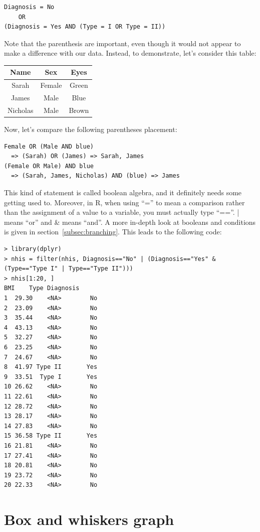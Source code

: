 \documentclass{report}
\newcommand{\code}[1]{\textsf{\ttfamily #1}}
\begin{document}
	\begin{verbatim}
Diagnosis = No 
	OR 
(Diagnosis = Yes AND (Type = I OR Type = II))	
	\end{verbatim}
	Note that the parenthesis are important, even though it would not appear to make a difference with our data. Instead, to demonstrate, let's consider this table:
	
\begin{tabular}{|c|c|c|}
	\hline
	Name & Sex & Eyes \\
	\hline
	Sarah & Female & Green \\
	James & Male & Blue \\
	Nicholas & Male & Brown \\
	\hline
\end{tabular}

Now, let's compare the following parentheses placement:
\begin{verbatim}
Female OR (Male AND blue)
  => (Sarah) OR (James) => Sarah, James
(Female OR Male) AND blue
  => (Sarah, James, Nicholas) AND (blue) => James
\end{verbatim}
	
	This kind of statement is called boolean algebra, and it definitely needs some getting used to. Moreover, in R, when using ``='' to mean a comparison rather than the assignment of a value to a variable, you must actually type ``==''. \code{|} means ``or'' and \code{\&} means ``and''. A more in-depth look at booleans and conditions is given in section~\ref{subsec:branching}. This leads to the following code:
	
	\begin{verbatim}
> library(dplyr)
> nhis = filter(nhis, Diagnosis=="No" | (Diagnosis=="Yes" & (Type=="Type I" | Type=="Type II")))
> nhis[1:20, ]
BMI    Type Diagnosis
1  29.30    <NA>        No
2  23.09    <NA>        No
3  35.44    <NA>        No
4  43.13    <NA>        No
5  32.27    <NA>        No
6  23.25    <NA>        No
7  24.67    <NA>        No
8  41.97 Type II       Yes
9  33.51  Type I       Yes
10 26.62    <NA>        No
11 22.61    <NA>        No
12 28.72    <NA>        No
13 28.17    <NA>        No
14 27.83    <NA>        No
15 36.58 Type II       Yes
16 21.81    <NA>        No
17 27.41    <NA>        No
18 20.81    <NA>        No
19 23.72    <NA>        No
20 22.33    <NA>        No
	\end{verbatim}
	
	\section{Box and whiskers graph}
	
\end{document}
